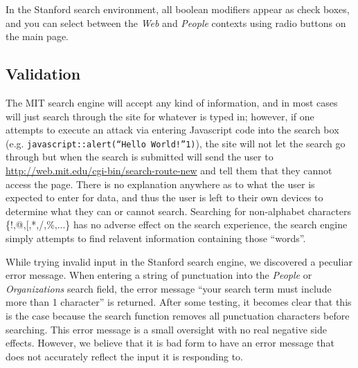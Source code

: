             In the Stanford search environment, all boolean modifiers appear as check
            boxes, and you can select between the \textsl{Web} and \textsl{People}
            contexts using radio buttons on the main page.

\subsection*{Validation}

            The MIT search engine will accept any kind of information, and in most cases will just
            search through the site for whatever is typed in; however, if one attempts to execute an
            attack via entering Javascript code into the search box (e.g. \texttt{javascript::alert(``Hello World!''1)}),
            the site will not let the search go through but when the search is submitted will send
            the user to \url{http://web.mit.edu/cgi-bin/search-route-new} and tell them that they
            cannot access the page. There is no explanation anywhere as to what the user is expected to
            enter for data, and thus the user is left to their own devices to determine what they can or
            cannot search. Searching for non-alphabet characters \{!,@,[,*,/,\%,...\} has no adverse effect on
            the search experience, the search engine simply attempts to find relavent information containing
            those ``words''.

            While trying invalid input in the Stanford search engine, we discovered
            a peculiar error message. When entering a string of punctuation into
            the \textsl{People} or \textsl{Organizations} search field, the
            error message ``your search term must include more than 1 character''
            is returned. After some testing, it becomes clear that this is the case
            because the search function removes all punctuation characters before
            searching. This error message is a small oversight with no real
            negative side effects. However, we believe that it is bad form
            to have an error message that does not accurately reflect the input
            it is responding to.

